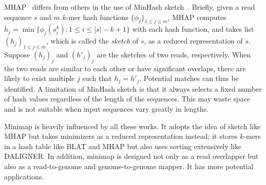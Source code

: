 \documentclass{bioinfo}
\begin{document}
\begin{methods}
MHAP~\citep{Berlin:2015xy} differs from others in the use of MinHash
sketch~\citep{Broder:1997aa}.  Briefly, given a read sequence $s$ and $m$
$k$-mer hash functions $\{\phi_j\}_{1\le j\le m}$, MHAP computes
$h_j=\min\{\phi_j(s_i^k):1\le i\le |s|-k+1\}$ with each hash function, and
takes list $(h_j)_{1\le j\le m}$, which is called the \emph{sketch} of
$s$, as a reduced representation of $s$. Suppose $(h_j)_j$ and $(h'_j)_j$ are
the sketches of two reads, respectively. When the two reads are similar to each
other or have significant overlaps, there are likely to exist multiple $j$ such
that $h_j=h'_j$. Potential matches can thus be identified. A limitation of
MinHash sketch is that it always selects a fixed number of hash values
regardless of the length of the sequences. This may waste space and is not
suitable when input sequences vary greatly in lengths.

Minimap is heavily influenced by all these works. It adopts the idea of sketch
like MHAP but takes minimizers \citep{Roberts:2004fv} as a reduced
representation instead; it stores $k$-mers in a hash table like BLAT and MHAP
but also uses sorting extensively like DALIGNER. In addition, minimap is
designed not only as a read overlapper but also as a read-to-genome and
genome-to-genome mapper. It has more potential applications.

%



\end{methods}
\end{document}
